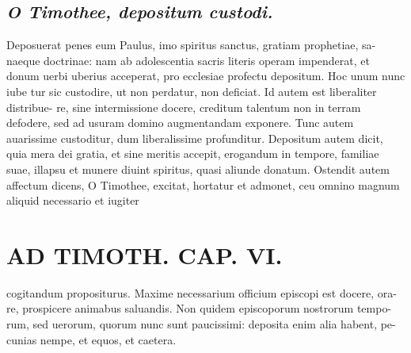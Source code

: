 \documentclass{article}
\begin{document}
\begin{pages}
{}
\subsection*{\textit{O Timothee, depositum custodi. }}\pstart Deposuerat penes eum Paulus, imo spiritus sanctus, gratiam prophetiae, sa- naeque doctrinae: nam ab adolescentia sacris literis operam impenderat, et donum uerbi uberius acceperat, pro ecclesiae profectu depositum. Hoc unum nunc iube tur sic custodire, ut non perdatur, non deficiat. Id autem est liberaliter distribue- re, sine intermissione docere, creditum talentum non in terram defodere, sed ad usuram domino augmentandam exponere. Tunc autem auarissime custoditur, dum liberalissime profunditur. Depositum autem dicit, quia mera dei gratia, et sine meritis accepit, erogandum in tempore, familiae suae, illapsu et munere diuint spiritus, quasi aliunde donatum. Ostendit autem affectum dicens, O Timothee, excitat, hortatur et admonet, ceu omnino magnum aliquid necessario et iugiter  \pend
\section*{AD TIMOTH. CAP. VI. }
\marginpar{[ p.543 ]}\pstart cogitandum propositurus. Maxime necessarium officium episcopi est docere, ora- re, prospicere animabus saluandis. Non quidem episcoporum nostrorum tempo- rum, sed uerorum, quorum nunc sunt paucissimi: deposita enim alia habent, pe- cunias nempe, et equos, et caetera.  \pend
{}
{}

\end{pages}
\end{document}
